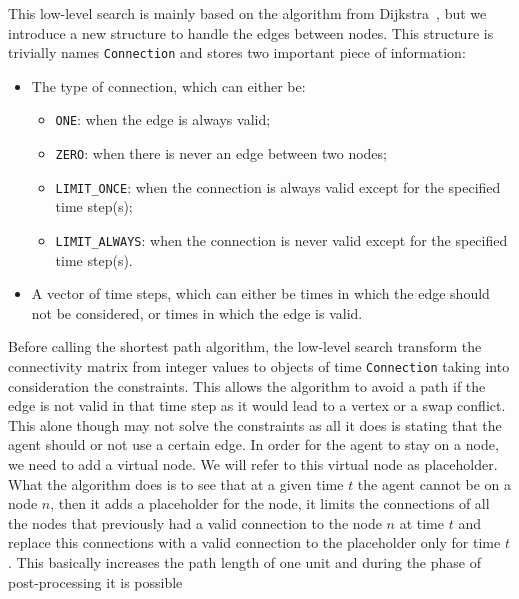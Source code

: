 \subsubsection{}
This low-level search is mainly based on the algorithm from 
Dijkstra~\cite{dijkstra}, but we introduce a new structure to handle the edges 
between nodes. \newline
This structure is trivially names \texttt{Connection} and stores two important 
piece of information:
\begin{itemize}
  \item The type of connection, which can either be:
    \begin{itemize}
      \item \texttt{ONE}: when the edge is always valid;
      \item \texttt{ZERO}: when there is never an edge between two nodes;
      \item \texttt{LIMIT\_ONCE}: when the connection is always valid except for
        the specified time step(s);
      \item \texttt{LIMIT\_ALWAYS}: when the connection is never valid except
        for the specified time step(s).
    \end{itemize}
  \item A vector of time steps, which can either be times in which the edge
    should not be considered, or times in which the edge is valid. 
\end{itemize}
Before calling the shortest path algorithm, the low-level search transform the
connectivity matrix from integer values to objects of time \texttt{Connection}
taking into consideration the constraints. This allows the algorithm to avoid a
path if the edge is not valid in that time step as it would lead to a vertex or
a swap conflict. \newline
This alone though may not solve the constraints as all it does is stating that
the agent should or not use a certain edge. In order for the agent to stay on
a node, we need to add a virtual node. We will refer to this virtual node as
placeholder. What the algorithm does is to see that at a given time $t$ the
agent cannot be on a node $n$, then it adds a placeholder for the node, it
limits the connections of all the nodes that previously had a valid connection
to the node $n$ at time $t$ and replace this connections with a valid
connection to the placeholder only for time $t$. This basically increases the
path length of one unit and during the phase of post-processing it is possible
